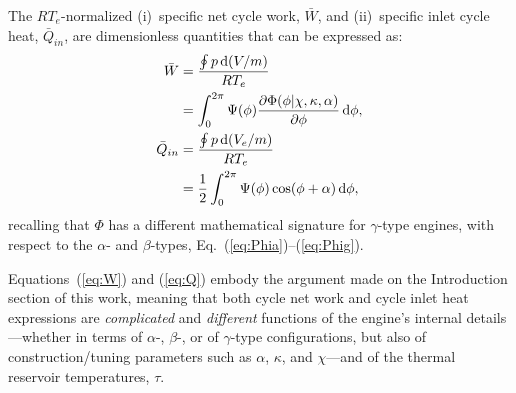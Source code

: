     The $RT_e$-normalized (i)~specific net cycle work, $\bar{W}$, and (ii)~specific inlet  cycle
    heat, $\bar{Q}_{in}$, are dimensionless quantities that can be expressed as:
    \begin{align}
        \label{eq:W}
        \bar{W} &= \frac{\oint p\,\mathrm{d}(V/m)}{RT_e} \nonumber\\
                &= \int_0^{2\pi} \Psi(\phi)
                   \frac{\partial\Phi(\phi | \chi, \kappa, \alpha)}{\partial\phi}\,\mathrm{d}\phi,\\
        \label{eq:Q}
        \bar{Q}_{in} &= \frac{\oint p\,\mathrm{d}(V_e/m)}{RT_e} \nonumber\\
                     &= \frac{1}{2} \int_0^{2\pi} \Psi(\phi)
                        \cos(\phi + \alpha) \,\mathrm{d}\phi,
    \end{align}
    \noindent recalling that $\Phi$ has a different  mathematical  signature  for  $\gamma$-type
    engines,      with      respect      to      the      $\alpha$-      and      $\beta$-types,
    Eq.~(\ref{eq:Phia})--(\ref{eq:Phig}).

    Equations~(\ref{eq:W}) and (\ref{eq:Q}) embody the argument made on the Introduction section
    of this work, meaning that both  cycle  net  work  and  cycle  inlet  heat  expressions  are
    \emph{complicated} and \emph{different} functions of the engine's internal details---whether
    in  terms  of  $\alpha$-,  $\beta$-,  or  of  $\gamma$-type  configurations,  but  also   of
    construction/tuning parameters such as $\alpha$, $\kappa$, and $\chi$---and of  the  thermal
    reservoir temperatures, $\tau$.


